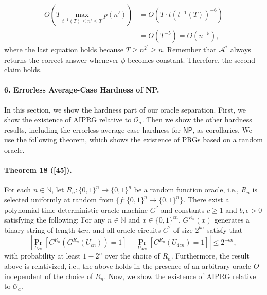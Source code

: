 \documentclass[10pt,a4paper]{article}
\begin{document}
\begin{align*}
O\left(T\max_{t^{-1}(T)\leq n'\leq T}p(n')\right)&=O(T\cdot t(t^{-1}(T))^{-6})\\
&=O(T^{-5})=O(n^{-5}),
\end{align*}
where the last equation holds because $T\geq n^{2^c}\geq n$. Remember that $\mathcal A^*$ always returns the correct answer whenever $\phi$ becomes constant. Therefore, the second claim holds.

\paragraph{6. Errorless Average-Case Hardness of NP.}
In this section, we show the hardness part of our oracle separation. First, we show the existence of AIPRG relative to $\mathcal O_a$. Then we show the other hardness results, including the errorless average-case hardness for $\mathsf{NP}$, as corollaries.
We use the following theorem, which shows the existence of PRGs based on a random oracle.
\paragraph{Theorem 18 ([45]).}
For each $n\in\mathbb N$, let $R_n:\{0,1\}^n\to\{0,1\}^n$ be a random function oracle, i.e., $R_n$ is selected uniformly at random from $\{f:\{0,1\}^n\to\{0,1\}^n\}$.
There exist a polynomial-time deterministic oracle machine $G^?$ and constants $c\geq1$ and $b,\epsilon>0$ satisfying the following: For any $n\in\mathbb N$ and $x\in\{0,1\}^{cn}$, $G^{R_n}(x)$ generates a binary string of length $4cn$, and all oracle circuits $C^?$ of size $2^{bn}$ satisfy that
\[\left|\Pr_{U_{cn}}[C^{R_n}(G^{R_n}(U_{cn}))=1]-\Pr_{U_{4cn}}[C^{R_n}(U_{4cn})=1]\right|\leq2^{-\epsilon n},\]
with probability at least $1-2^n$ over the choice of $R_n$.
Furthermore, the result above is relativized, i.e., the above holds in the presence of an arbitrary oracle $O$ independent of the choice of $R_n$.
Now, we show the existence of AIPRG relative to $\mathcal O_a$.
\end{document}
